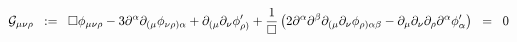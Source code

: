 \begin{equation}
{\cal{G}}_{\mu\nu\rho} \;\; :=\;\; \square \phi_{\mu\nu\rho} - 3 
\partial^{\alpha} \partial_{( \mu} \phi_{\nu\rho ) \alpha} + 
\partial_{( \mu} \partial_{\nu} {\phi}^{\prime}_{\rho )} + 
\frac{1}{\square} \left( 2 \partial^{\alpha} \partial^{\beta} 
\partial_{( \mu} \partial_{\nu} \phi_{\rho ) \alpha\beta} - 
\partial_{\mu} \partial_{\nu} \partial_{\rho} \partial^{\alpha} 
\phi^{\prime}_{\alpha} \right) \;\; =\;\; 0
\label{eq:b1}
\end{equation}

